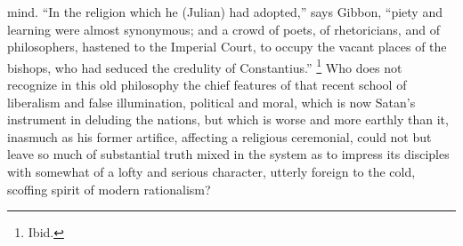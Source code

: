 mind. ``In the religion which he (Julian) had adopted,'' says
Gibbon, ``piety and learning were almost synonymous; and a crowd
of poets, of rhetoricians, and of philosophers, hastened to the
Imperial Court, to occupy the vacant places of the bishops, who had
seduced the credulity of Constantius.'' \footnote{Ibid.} Who does not recognize in this old philosophy the chief
features of that recent school of liberalism and false illumination,
political and moral, which is now Satan's instrument in deluding the
nations, but which is worse and more earthly than it, inasmuch as his
former artifice, affecting a religious ceremonial, could not but leave
so much of substantial truth mixed in the system as to impress its
disciples with somewhat of a lofty and serious character, utterly
foreign to the cold, scoffing spirit of modern rationalism?

